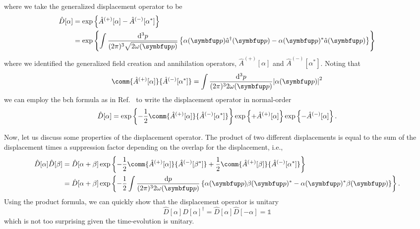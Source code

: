 where we take the generalized displacement operator to be
\begin{equation}
	\begin{split}
		\hat{D}[\alpha]
		&=
		\exp\left\{
			\hat{A}^{(+)}[\alpha]
			-
			\hat{A}^{(-)}[\alpha^*]
		\right\}
		\\
		&=
		\exp\left\{
			\int\frac{\dd[3]{p}}{(2\pi) ^3\sqrt{2\omega(\vb{p})}}
			\left\{
				\alpha(\vb{p})
				\hat{a}^\dagger(\vb{p})
				-
				\alpha(\vb{p})^*
				\hat{a}(\vb{p})
			\right\}
		\right\}
	\end{split}
	\label{eq:displacement_operator}
\end{equation}
where we identified the generalized field creation and annihilation operators, $\hat{A}^{(+)}[\alpha]$ and $\hat{A}^{(-)}[\alpha^*]$.
Noting that
\begin{equation}
	\comm{\hat{A}^{(+)}[\alpha]}{\hat{A}^{(-)}[\alpha^*]}
	=
	\int\frac{\dd[3]{p}}{(2\pi)^32\omega(\vb{p})}
	\abs*{\alpha(\vb{p})}^2
\end{equation}
we can employ the \gls{bch} formula as in Ref.~\cite[p.~48]{Barnett2002} to write the displacement operator in normal-order
\begin{equation}
	\hat{D}[\alpha]
	=
	\exp\left\{
		-
		\frac{1}{2}
		\comm{\hat{A}^{(+)}[\alpha]}{\hat{A}^{(-)}[\alpha^*]}
	\right\}
	\exp\left\{
		+
		\hat{A}^{(+)}[\alpha]
	\right\}
	\exp\left\{
		-
		\hat{A}^{(-)}[\alpha]
	\right\}
	.
\end{equation}

Now, let us discuss some properties of the displacement operator.
The product of two different displacements is equal to the sum of the displacement times a suppression factor depending on the overlap for the displacement, i.e.,
\begin{equation}
	\begin{split}
		\hat{D}[\alpha]
		\hat{D}[\beta]
		&=
		\hat{D}[\alpha+\beta]
		\exp\left\{
			-
			\frac{1}{2}
			\comm{\hat{A}^{(+)}[\alpha]}{\hat{A}^{(-)}[\beta^*]}
			+
			\frac{1}{2}
			\comm{\hat{A}^{(+)}[\beta]}{\hat{A}^{(-)}[\alpha^*]}
		\right\}
		\\
		&=
		\hat{D}[\alpha+\beta]
		\exp\left\{
			-
			\frac{1}{2}
			\int\frac{\dd{p}}{(2\pi)^32\omega(\vb{p})}
			\left\{
				\alpha(\vb{p})
				\beta(\vb{p})^*
				-
				\alpha(\vb{p})^*
				\beta(\vb{p})
			\right\}
		\right\}
		.
	\end{split}
\end{equation}
Using the product formula, we can quickly show that the displacement operator is unitary
\begin{equation}
	\hat{D}[\alpha]
	\hat{D}[\alpha]^\dagger
	=
	\hat{D}[\alpha]
	\hat{D}[-\alpha]
	=
	\mathbb{1}
\end{equation}
which is not too surprising given the time-evolution is unitary.

